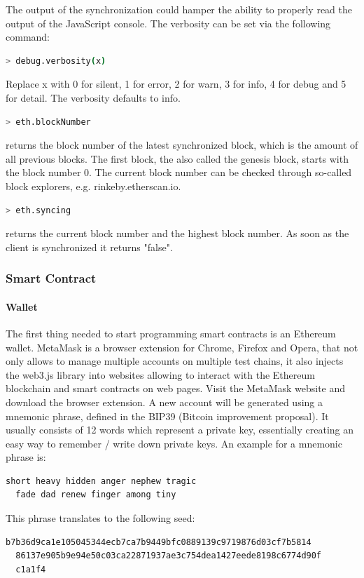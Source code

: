 The output of the synchronization could hamper the ability to properly read the output of the JavaScript console. The verbosity can be set via the following command:

\begin{lstlisting}[language=bash]
  > debug.verbosity(x)
\end{lstlisting}

Replace x with 0 for silent, 1 for error, 2 for warn, 3 for info, 4 for debug and 5 for detail. The verbosity defaults to info\cite{cli-options}.
\newpage

\begin{lstlisting}[language=bash]
  > eth.blockNumber
\end{lstlisting}

returns the block number of the latest synchronized block, which is the amount of all previous blocks. The first block, the also called the genesis block, starts with the block number 0. The current block number can be checked through so-called block explorers, e.g. {rinkeby.etherscan.io}.
\\
\begin{lstlisting}[language=bash]
  > eth.syncing
\end{lstlisting}
returns the current block number and the highest block number. As soon as the client is synchronized it returns "false"\cite{javascript-0.20}.


\subsubsection{Smart Contract}
\paragraph{Wallet}
The first thing needed to start programming smart contracts is an Ethereum wallet. MetaMask is a browser extension for Chrome, Firefox and Opera, that not only allows to manage multiple accounts on multiple test chains, it also injects the web3.js library into websites allowing to interact with the Ethereum blockchain and smart contracts on web pages.
Visit the MetaMask\cite{metamask} website and download the browser extension. A new account will be generated using a mnemonic phrase, defined in the BIP39 (Bitcoin improvement proposal)\cite{bip39}. It usually consists of 12 words which represent a private key, essentially creating an easy way to remember / write down private keys. An example for a mnemonic phrase is:
\begin{lstlisting}[language=bash]
  short heavy hidden anger nephew tragic
  fade dad renew finger among tiny
\end{lstlisting}
This phrase translates to the following seed:
\begin{lstlisting}[language=bash]
  b7b36d9ca1e105045344ecb7ca7b9449bfc0889139c9719876d03cf7b5814
  86137e905b9e94e50c03ca22871937ae3c754dea1427eede8198c6774d90f
  c1a1f4
\end{lstlisting}

